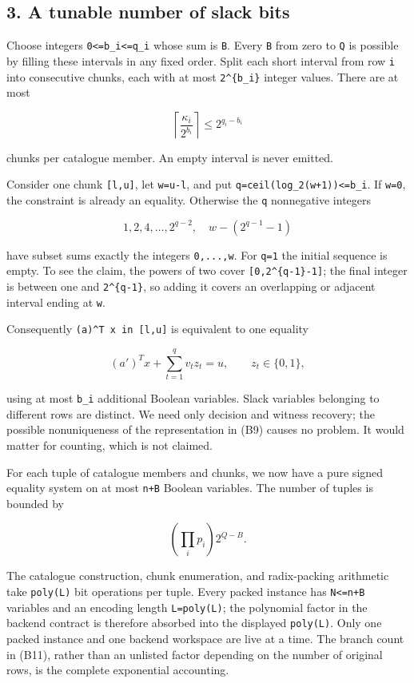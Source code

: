 \hypertarget{af-77b0bb6793-a-tunable-number-of-slack-bits}{%
\subsection{3. A tunable number of slack bits}\label{af-77b0bb6793-a-tunable-number-of-slack-bits}}

Choose integers \texttt{0\textless{}=b\_i\textless{}=q\_i} whose sum is \texttt{B}. Every \texttt{B} from zero to \texttt{Q} is possible by filling these intervals in any fixed order. Split each short interval from row \texttt{i} into consecutive chunks, each with at most \texttt{2\^{}\{b\_i\}} integer values. There are at most

\[
\left\lceil\frac{\kappa_i}{2^{b_i}}\right\rceil
\le 2^{q_i-b_i}
\tag{B8}
\]

chunks per catalogue member. An empty interval is never emitted.

Consider one chunk \texttt{{[}l,u{]}}, let \texttt{w=u-l}, and put \texttt{q=ceil(log\_2(w+1))\textless{}=b\_i}. If \texttt{w=0}, the constraint is already an equality. Otherwise the \texttt{q} nonnegative integers

\[
1,2,4,\ldots,2^{q-2},\quad w-(2^{q-1}-1)
\tag{B9}
\]

have subset sums exactly the integers \texttt{0,...,w}. For \texttt{q=1} the initial sequence is empty. To see the claim, the powers of two cover \texttt{{[}0,2\^{}\{q-1\}-1{]}}; the final integer is between one and \texttt{2\^{}\{q-1\}}, so adding it covers an overlapping or adjacent interval ending at \texttt{w}.

Consequently \texttt{(a\textquotesingle{})\^{}T\ x\ in\ {[}l,u{]}} is equivalent to one equality

\[
(a')^T x+\sum_{t=1}^{q}v_t z_t=u,
\qquad z_t\in\{0,1\},
\tag{B10}
\]

using at most \texttt{b\_i} additional Boolean variables. Slack variables belonging to different rows are distinct. We need only decision and witness recovery; the possible nonuniqueness of the representation in (B9) causes no problem. It would matter for counting, which is not claimed.

For each tuple of catalogue members and chunks, we now have a pure signed equality system on at most \texttt{n+B} Boolean variables. The number of tuples is bounded by

\[
\left(\prod_i p_i\right)2^{Q-B}.
\tag{B11}
\]

The catalogue construction, chunk enumeration, and radix-packing arithmetic take \texttt{poly(L)} bit operations per tuple. Every packed instance has \texttt{N\textless{}=n+B} variables and an encoding length \texttt{L\textquotesingle{}=poly(L)}; the polynomial factor in the backend contract is therefore absorbed into the displayed \texttt{poly(L)}. Only one packed instance and one backend workspace are live at a time. The branch count in (B11), rather than an unlisted factor depending on the number of original rows, is the complete exponential accounting.

